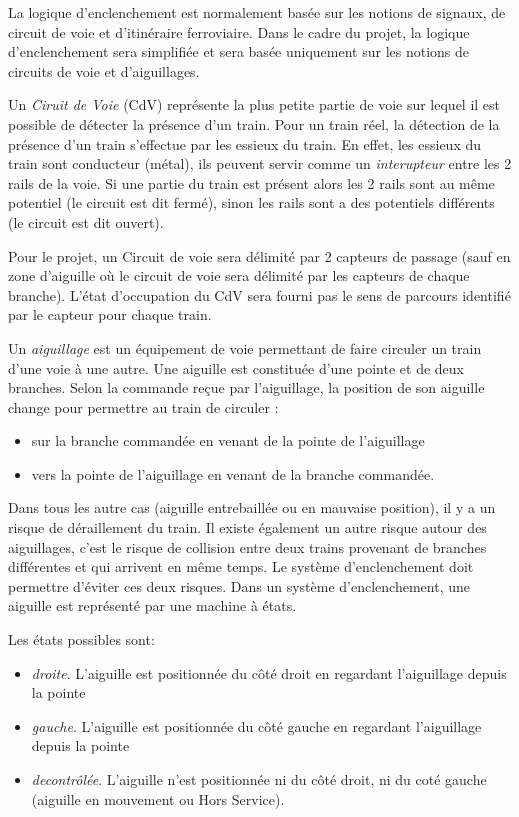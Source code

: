 La logique d'enclenchement est normalement basée sur les notions de signaux, de
circuit de voie et d'itinéraire ferroviaire. Dans le cadre du projet,
la logique d'enclenchement sera simplifiée et sera basée uniquement sur les
notions de circuits de voie et d'aiguillages. 

\medskip
Un \emph{Ciruit de Voie} (CdV) représente la plus petite partie de
voie sur lequel il est possible de détecter la présence d'un
train. Pour un train réel, la détection de la présence d'un train
s'effectue par les essieux du train. En effet, les essieux du train
sont conducteur (métal), ils peuvent servir comme un
\emph{interupteur} entre les 2 rails de la voie. Si une partie du
train est présent alors les 2 rails sont au même potentiel (le circuit
est dit fermé), sinon les rails sont a des potentiels différents (le
circuit est dit ouvert).

\medskip
Pour le projet, un Circuit de voie sera délimité par 2 capteurs de
passage (sauf en zone d'aiguille où le circuit de voie sera délimité
par les capteurs de chaque branche). L'état d'occupation du CdV sera
fourni pas le sens de parcours identifié par le capteur pour chaque
train.

\medskip
Un \emph{aiguillage} est un équipement de voie permettant de faire
circuler un train d'une voie à une autre. Une aiguille est constituée
d'une pointe et de deux branches. Selon la commande reçue par
l'aiguillage, la position de son aiguille change pour permettre au train
de circuler :
\begin{itemize}
\item sur la branche commandée en venant de la pointe de l'aiguillage
\item vers la pointe de l'aiguillage en venant de la branche commandée.
\end{itemize}

\medskip
Dans tous les autre cas (aiguille entrebaillée ou en mauvaise position), 
il y a un risque de déraillement du train. Il existe également un autre 
risque autour des aiguillages, c'est le risque de collision entre deux
trains provenant de branches différentes et qui arrivent en même temps. Le système
d'enclenchement doit permettre d'éviter ces deux risques.
Dans un système d'enclenchement, une aiguille est représenté par une 
machine à états.

Les états possibles sont:

\begin{itemize}
\item \emph{droite}. L'aiguille est positionnée du côté droit en regardant
l'aiguillage depuis la pointe
\item \emph{gauche}. L'aiguille est positionnée du côté gauche en regardant
l'aiguillage depuis la pointe
\item \emph{decontrôlée}. L'aiguille n'est positionnée ni du côté droit, 
ni du coté gauche (aiguille en mouvement ou Hors Service).
\end{itemize}


